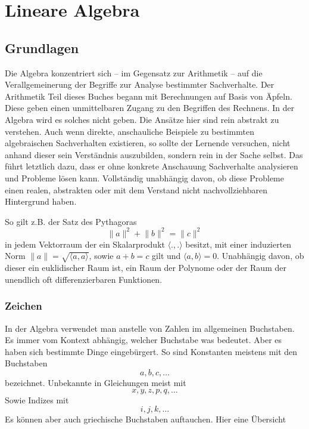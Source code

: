 \part{Lineare Algebra}


\chapter{Grundlagen}

Die Algebra konzentriert sich -- im Gegensatz zur Arithmetik -- auf die Verallgemeinerung der Begriffe zur Analyse bestimmter Sachverhalte. Der Arithmetik Teil dieses Buches begann mit Berechnungen auf Basis von Äpfeln. Diese geben einen unmittelbaren Zugang zu den Begriffen des Rechnens. In der Algebra wird es solches nicht geben. Die Ansätze hier sind rein abstrakt zu verstehen. Auch wenn direkte, anschauliche Beispiele zu bestimmten algebraischen Sachverhalten existieren, so sollte der Lernende versuchen, nicht anhand dieser sein Verständnis auszubilden, sondern rein in der Sache selbst. Das führt letztlich dazu, dass er ohne konkrete Anschauung Sachverhalte analysieren und Probleme lösen kann. Vollständig unabhängig davon, ob diese Probleme einen realen, abstrakten oder mit dem Verstand nicht nachvollziehbaren Hintergrund haben. 

So gilt z.B. der Satz des Pythagoras 
\[\lVert a\rVert ^2 +\lVert b\rVert ^2 = \lVert c\rVert^2\]
in jedem Vektorraum der ein Skalarprodukt $\langle .,.\rangle $ besitzt, mit einer induzierten Norm $\lVert a \rVert = \sqrt{\langle a,a\rangle} $, sowie $a+b=c$ gilt und $\langle a,b\rangle = 0 $. Unabhängig davon, ob dieser ein euklidischer Raum ist, ein Raum der Polynome oder der Raum der unendlich oft differenzierbaren Funktionen.

\section{Zeichen}

In der Algebra verwendet man anstelle von Zahlen im allgemeinen Buchstaben. Es immer vom Kontext abhängig, welcher Buchstabe was bedeutet. Aber es haben sich bestimmte Dinge eingebürgert. So sind Konstanten meistens mit den Buchstaben
\[a, b, c, \dots \]
bezeichnet. Unbekannte in Gleichungen meist mit 
\[x, y, z, p, q, \dots \]
Sowie Indizes mit 
\[i, j, k, \dots \]
Es können aber auch griechische Buchstaben auftauchen. Hier eine Übersicht

\bigskip

